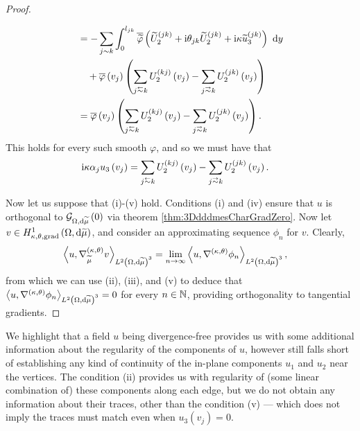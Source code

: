 \begin{proof}
\begin{enumerate}[(i)]
\begin{align*}
			&= - \sum_{j\con k}\int_0^{l_{jk}} \overline{\widetilde{\varphi}}\bracs{ \widetilde{U}_2^{(jk)} + \rmi\qm_{jk}\widetilde{U}_2^{(jk)} + \rmi\wavenumber\widetilde{u}_3^{(jk)} } \ \md y \\
			&\quad + \overline{\varphi}\bracs{v_j}\bracs{ \sum_{j\conRight k} U_2^{(kj)}\bracs{v_j} - \sum_{j\conLeft k} U_2^{(jk)}\bracs{v_j} } \\
			&= \overline{\varphi}\bracs{v_j}\bracs{ \sum_{j\conRight k} U_2^{(kj)}\bracs{v_j} - \sum_{j\conLeft k} U_2^{(jk)}\bracs{v_j} }.
		\end{align*}
		This holds for every such smooth $\varphi$, and so we must have that
		\begin{align*}
			\rmi\wavenumber\alpha_j u_3\bracs{v_j} &= \sum_{j\conRight k} U_2^{(kj)}\bracs{v_j} - \sum_{j\conLeft k} U_2^{(jk)}\bracs{v_j}.
		\end{align*}
	\end{enumerate}
	
	Now let us suppose that (i)-(v) hold.
	Conditions (i) and (iv) ensure that $u$ is orthogonal to $\mathcal{G}_{ \Omega, \mathrm{d}\widetilde{\mu}}\left( 0 \right)$ via theorem \ref{thm:3DdddmesCharGradZero}.
	Now let $v\in H^1_{\kappa,\theta,\mathrm{grad}}\left( \Omega, \mathrm{d}\widetilde{\mu} \right)$, and consider an approximating sequence $\phi_n$ for $v$.
	Clearly,
	\begin{align*}
		\left\langle u , \nabla^{\left( \kappa, \theta \right)}_{\widetilde{\mu}}v \right\rangle_{L^{2}\left( \Omega,\mathrm{d} \widetilde{\mu} \right)^3}
		&= \lim_{n\rightarrow\infty}\left\langle u , \nabla^{\left( \kappa, \theta \right)}\phi_n \right\rangle_{L^{2}\left( \Omega,\mathrm{d} \widetilde{\mu} \right)^3},
	\end{align*}
	from which we can use (ii), (iii), and (v) to deduce that $\left\langle u , \nabla^{\left( \kappa, \theta \right)}\phi_n \right\rangle_{L^{2}\left( \Omega,\mathrm{d} \widetilde{\mu} \right)^3}=0$ for every $n\in\mathbb{N}$, providing orthogonality to tangential gradients.
\end{proof}
We highlight that a field $u$ being divergence-free provides us with some additional information about the regularity of the components of $u$, however still falls short of establishing any kind of continuity of the in-plane components $u_1$ and $u_2$ near the vertices.
The condition (ii) provides us with regularity of (some linear combination of) these components along each edge, but we do not obtain any information about their traces, other than the condition (v) --- which does not imply the traces must match even when $u_3(v_j)=0$.

